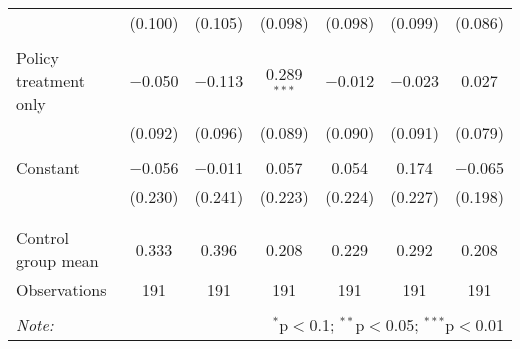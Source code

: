 \begin{tabular}{@{\extracolsep{5pt}}lcccccc}
  & (0.100) & (0.105) & (0.098) & (0.098) & (0.099) & (0.086) \\ 
  & & & & & & \\ 
 Policy treatment only & $-$0.050 & $-$0.113 & 0.289$^{***}$ & $-$0.012 & $-$0.023 & 0.027 \\ 
  & (0.092) & (0.096) & (0.089) & (0.090) & (0.091) & (0.079) \\ 
  & & & & & & \\ 
 Constant & $-$0.056 & $-$0.011 & 0.057 & 0.054 & 0.174 & $-$0.065 \\ 
  & (0.230) & (0.241) & (0.223) & (0.224) & (0.227) & (0.198) \\ 
  & & & & & & \\ 
\hline \\[-1.8ex] 
Control group mean & 0.333 & 0.396 & 0.208 & 0.229 & 0.292 & 0.208 \\ 
Observations & 191 & 191 & 191 & 191 & 191 & 191 \\ 
\hline 
\hline \\[-1.8ex] 
\textit{Note:}  & \multicolumn{6}{r}{$^{*}$p$<$0.1; $^{**}$p$<$0.05; $^{***}$p$<$0.01} \\ 
\end{tabular} 
